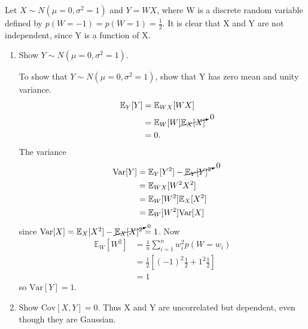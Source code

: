 \begin{example}
	Let $X\sim N(\mu =0, \sigma^2 = 1)$ and $Y = WX$, where W is a discrete random variable defined by $p(W=-1)=p(W=1)=\frac{1}{2}$. It is clear that X and Y are not independent, since Y is a function of X.
	\begin{enumerate}
		\item Show $Y\sim N(\mu =0, \sigma^2 = 1)$.\newline
		
		To show that $Y\sim N(\mu =0, \sigma^2 = 1)$, show that Y has zero mean and unity variance.
		\begin{equation}
			\begin{split}
				\mathbb{E}_Y[Y] &= \mathbb{E}_{WX}[WX]\\
				&=\mathbb{E}_W[W]\cancelto{0}{\mathbb{E}_X[X]}\\
				&=0.
			\end{split}
		\end{equation}
		The variance
		\begin{equation}
			\begin{split}
				\text{Var}[Y] &= \mathbb{E}_Y[Y^2]-\cancelto{0}{\mathbb{E}_Y[Y]^2}\\
				& = \mathbb{E}_{WX}[W^2X^2]\\
				&= \mathbb{E}_W[W^2]\mathbb{E}_X[X^2]\\
				& = \mathbb{E}_W[W^2]\text{Var}[X]
			\end{split}
		\end{equation}
		since $\text{Var}[X]=\mathbb{E}_X[X^2]-\cancelto{0}{\mathbb{E}_X[X]^2}=1$. Now
		\begin{equation}
			\begin{split}
				\mathbb{E}_W[W^2]&= \frac{1}{n}\sum_{i=1}^nw_i^2p(W = w_i)\\
				&= \frac{1}{2}[(-1)^2\frac{1}{2}+1^2\frac{1}{2}]\\
				&= 1
			\end{split}
		\end{equation}
		so $\text{Var}[Y] =1$.
		\item Show $\text{Cov}[X,Y]=0$. Thus X and Y are uncorrelated but dependent, even though they are Gaussian.
		

\end{enumerate}
\end{example}
